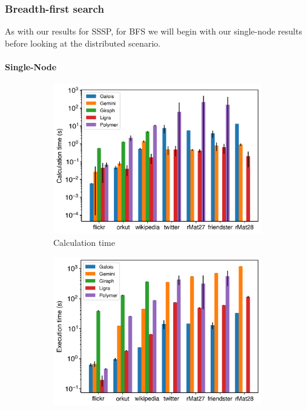 
\subsubsection{Breadth-first search}
As with our results for SSSP, for BFS we will begin with our single-node results before looking at the distributed scenario. 

\paragraph{Single-Node}
\begin{figure}[ht]
	\begin{subfigure}{0.32\textwidth}
		\includegraphics[width=\linewidth]{../../plots/singleNodeBFS_calcTime.png}
		\caption{Calculation time}
		\label{fig:singleNodeBFS_calc}
	\end{subfigure}
	\hfil
	\begin{subfigure}{0.32\textwidth}
		\includegraphics[width=\linewidth]{../../plots/singleNodeBFS_execTime.png}

\end{subfigure}
\end{figure}
